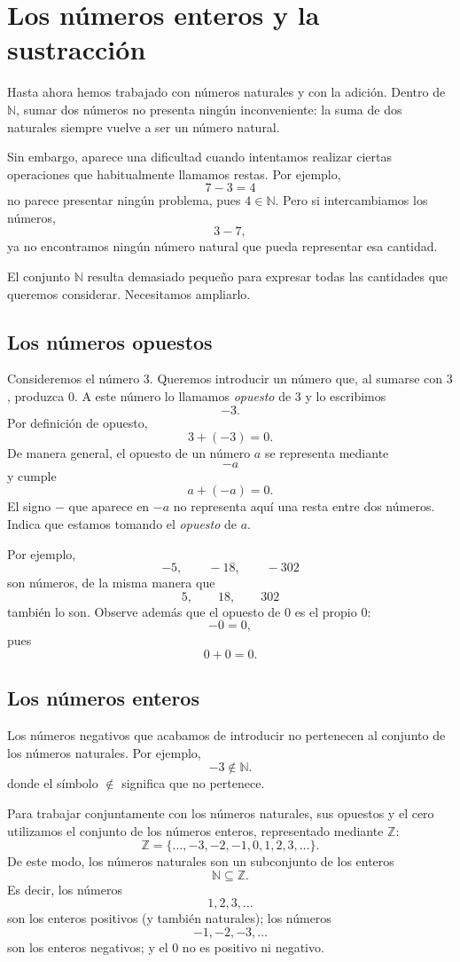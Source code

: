 \section{Los números enteros y la sustracción}

Hasta ahora hemos trabajado con números naturales y con la adición. Dentro de \(\mathbb{N}\), sumar dos números no presenta ningún inconveniente: la suma de dos naturales siempre vuelve a ser un número natural.

Sin embargo, aparece una dificultad cuando intentamos realizar ciertas operaciones que habitualmente llamamos restas. Por ejemplo,
\[
7-3=4
\]
no parece presentar ningún problema, pues \(4\in\mathbb{N}\). Pero si intercambiamos los números,
\[
3-7,
\]
ya no encontramos ningún número natural que pueda representar esa cantidad.

El conjunto \(\mathbb{N}\) resulta demasiado pequeño para expresar todas las cantidades que queremos considerar. Necesitamos ampliarlo.

\subsection{Los números opuestos}

Consideremos el número \(3\). Queremos introducir un número que, al sumarse con \(3\), produzca \(0\). A este número lo llamamos \emph{opuesto} de \(3\) y lo escribimos
\[
-3.
\]
Por definición de opuesto,
\[
3+(-3)=0.
\]
De manera general, el opuesto de un número \(a\) se representa mediante
\[
-a
\]
y cumple
\[
a+(-a)=0.
\]
El signo \(-\) que aparece en \(-a\) no representa aquí una resta entre dos números. Indica que estamos tomando el \emph{opuesto} de \(a\).

Por ejemplo,
\[
-5,\qquad -18,\qquad -302
\]
son números, de la misma manera que
\[
5,\qquad18,\qquad302
\]
también lo son.
Observe además que el opuesto de \(0\) es el propio \(0\):
\[
-0=0,
\]
pues
\[
0+0=0.
\]

\subsection{Los números enteros}

Los números negativos que acabamos de introducir no pertenecen al conjunto de los números naturales. Por ejemplo,
\[
-3\notin\mathbb{N}.
\]
donde el símbolo \(\notin\) significa que no pertenece.

Para trabajar conjuntamente con los números naturales, sus opuestos y el cero utilizamos el conjunto de los números enteros, representado mediante \(\mathbb{Z}\):
\[
\mathbb{Z}
=
\{\ldots,-3,-2,-1,0,1,2,3,\ldots\}.
\]
De este modo, los números naturales son un subconjunto de los enteros
\[
\mathbb{N}\subseteq\mathbb{Z}.
\]
Es decir, los números
\[
1,2,3,\ldots
\]
son los enteros positivos (y también naturales); los números
\[
-1,-2,-3,\ldots
\]
son los enteros negativos; y el \(0\) no es positivo ni negativo.

